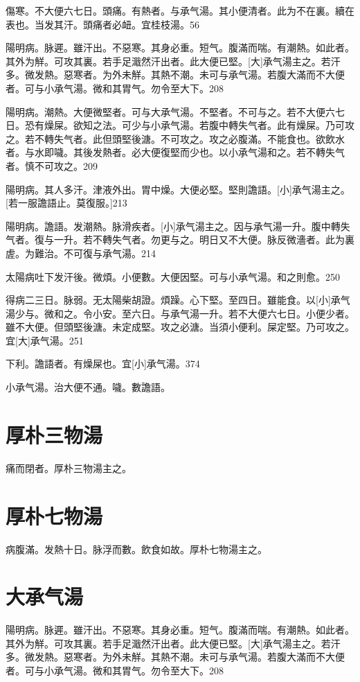 \documentclass[12pt,twoside,UTF8,b5paper]{ctexbook}
\begin{document}
傷寒。不大便六七日。頭痛。有熱者。与承气湯。其小便清者。此为不在裏。續在表也。当发其汗。頭痛者必衄。宜桂枝湯。56

陽明病。脉遲。雖汗出。不惡寒。其身必重。短气。腹滿而喘。有潮熱。如此者。其外为觧。可攻其裏。若手足濈然汗出者。此大便已堅。[大]承气湯主之。若汗多。微发熱。惡寒者。为外未觧。其熱不潮。未可与承气湯。若腹大滿而不大便者。可与小承气湯。微和其胃气。勿令至大下。208

陽明病。潮熱。大便微堅者。可与大承气湯。不堅者。不可与之。若不大便六七日。恐有燥屎。欲知之法。可少与小承气湯。若腹中轉失气者。此有燥屎。乃可攻之。若不轉失气者。此但頭堅後溏。不可攻之。攻之必腹滿。不能食也。欲飲水者。与水即噦。其後发熱者。必大便復堅而少也。以小承气湯和之。若不轉失气者。慎不可攻之。209

陽明病。其人多汗。津液外出。胃中燥。大便必堅。堅則譫語。[小]承气湯主之。[若一服譫語止。莫復服。]213

陽明病。譫語。发潮熱。脉滑疾者。[小]承气湯主之。因与承气湯一升。腹中轉失气者。復与一升。若不轉失气者。勿更与之。明日又不大便。脉反微濇者。此为裏虗。为難治。不可復与承气湯。214

太陽病吐下发汗後。微煩。小便數。大便因堅。可与小承气湯。和之則愈。250

得病二三日。脉弱。无太陽柴胡證。煩躁。心下堅。至四日。雖能食。以[小]承气湯少与。微和之。令小安。至六日。与承气湯一升。若不大便六七日。小便少者。雖不大便。但頭堅後溏。未定成堅。攻之必溏。当須小便利。屎定堅。乃可攻之。宜[大]承气湯。251

下利。譫語者。有燥屎也。宜[小]承气湯。374

小承气湯。治大便不通。噦。數譫語。

\section{厚朴三物湯}

痛而閉者。厚朴三物湯主之。

\section{厚朴七物湯}

病腹滿。发熱十日。脉浮而數。飲食如故。厚朴七物湯主之。

\section{大承气湯}

陽明病。脉遲。雖汗出。不惡寒。其身必重。短气。腹滿而喘。有潮熱。如此者。其外为觧。可攻其裏。若手足濈然汗出者。此大便已堅。[大]承气湯主之。若汗多。微发熱。惡寒者。为外未觧。其熱不潮。未可与承气湯。若腹大滿而不大便者。可与小承气湯。微和其胃气。勿令至大下。208
\end{document}
